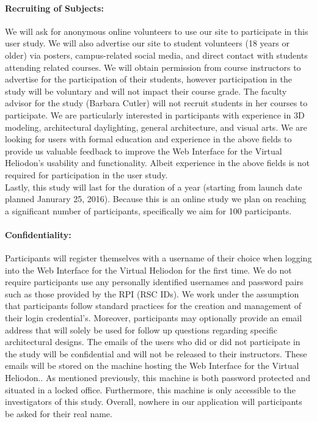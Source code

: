 \documentclass[12pt]{article}
\begin{document}
\paragraph{Recruiting of Subjects:}
We will ask for anonymous online volunteers to use our site to participate in this user study. 
We will also advertise our site to student volunteers (18 years or older) via posters, campus-related social media, and direct contact with students attending related courses. 
We will obtain permission from course instructors to advertise for the participation of their students, however participation in the study will be voluntary and will not impact their course grade. 
The faculty advisor for the study (Barbara Cutler) will not recruit students in her courses to participate.  
We are particularly interested in participants with experience in 3D modeling, architectural daylighting, general architecture, and visual arts.
We are looking for users with formal education and experience in the above fields to provide us valuable feedback to improve the Web Interface for the Virtual Heliodon's usability and functionality. 
Albeit experience in the above fields is not required for participation in the user study.\\

\noindent Lastly, this study will last for the duration of a year (starting from launch date planned Janurary 25, 2016).
Because this is an online study we plan on reaching a significant number of participants, specifically we aim for 100 participants.

\paragraph{Confidentiality:} 
Participants will register themselves with a username of their choice when logging into the Web Interface for the Virtual Heliodon for the first time. 
We do not require participants use any personally identified usernames and password pairs such as those provided by the RPI (RSC IDs). 
We work under the assumption that participants follow standard practices for the creation and management of their login credential's.
Moreover, participants may optionally provide an email address that will solely be used for follow up questions regarding specific architectural designs.
The emails of the users who did or did not participate in the study will be confidential and will not be released to their instructors. 
These emails will be stored on the machine hosting the Web Interface for the Virtual Heliodon.. 
As mentioned previously, this machine is both password protected and situated in a locked office.
Furthermore, this machine is only accessible to the investigators of this study.
Overall, nowhere in our application will participants be asked for their real name. 
\end{document}
